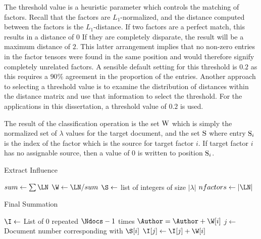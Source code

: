 \documentclass[../ut-dissertation.tex]{subfiles}
\begin{document}
The threshold value is a heuristic parameter which controls the
matching of factors. Recall that the factors are $L_1$-normalized, and
the distance computed between the factors is the $L_1$-distance. If
two factors are a perfect match, this results in a distance of $0$
If they are completely disparate, the result will be a maximum
distance of $2$.  This latter arrangement implies that no non-zero
entries in the factor tensors were found in the same position and
would therefore signify completely unrelated factors.  A sensible
default setting for this threshold is $0.2$ as this requires a $90\%$
agreement in the proportion of the entries.  Another approach to
selecting a threshold value is to examine the distribution of
distances within the distance matrix and use that information to
select the threshold.  For the applications in this dissertation, a
threshold value of $0.2$ is used.

The result of the classification operation is the set $\mathrm{W}$ which
is simply the normalized set of $\lambda$ values for the target
document, and the set $\mathrm{S}$ where entry $\mathrm{S}_i$ is the index
of the factor which is the source for target factor $i$.  If target
factor $i$ has no assignable source, then a value of 0 is written to
position $\mathrm{S}_i$.
\begin{algorithm}
  \caption{Extract Influence}
  \label{alg:influence}
   
   
  
  \Output{\W, \S}
  \BlankLine
  $sum \leftarrow \sum \LN$\;
  $\W \leftarrow \LN / sum$\;
  $\S \leftarrow$ list of integers of size $|\lambda|$\;
  $nfactors \leftarrow |\LN|$\;
  \Return{\W, \S}\;
\end{algorithm}

\begin{algorithm}
  \caption{Final Summation}
  \label{alg:summation}
   
   
  
  \Input{\Ndocs, \S, \W}
  \Output{\I, \Author}
  \BlankLine
  $\I \leftarrow $ List of 0 repeated $\Ndocs-1$ times\;
   {
     {
      $\Author = \Author + \W[i]$\;
    }{
      $j \leftarrow $ Document number corresponding with $\S[i]$\;
      $\I[j] \leftarrow \I[j] + \W[i]$\;
    }
  }
\end{algorithm}
\end{document}
